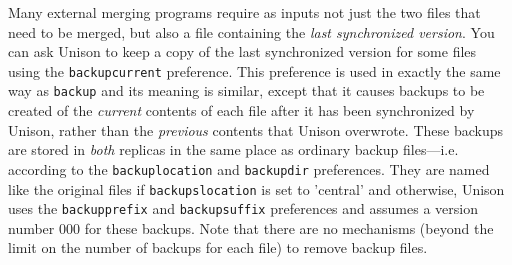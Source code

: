 \documentclass{article}
\begin{document}
Many external merging programs require as inputs not just the two files that
need to be merged, but also a file containing the {\em last synchronized
  version}.  You can ask Unison to keep a copy of the last synchronized
version for some files using the \verb|backupcurrent| preference. This
preference is used in exactly the same way as \verb|backup| and its meaning
is similar, except that it causes backups to be created of the {\em current}
contents of each file after it has been synchronized by Unison, rather than
the {\em previous} contents that Unison overwrote.  These backups are stored
in {\em both} replicas in the same place as ordinary backup files---i.e.
according to the \verb|backuplocation| and \verb|backupdir| preferences.
They are named like the original files if \verb|backupslocation| is set to
'central' and otherwise, Unison uses the \verb|backupprefix| and
\verb|backupsuffix| preferences and assumes a version number 000 for these
backups.  Note that there are no mechanisms (beyond the limit on the number of
backups for each file) to remove backup files.
\end{document}
